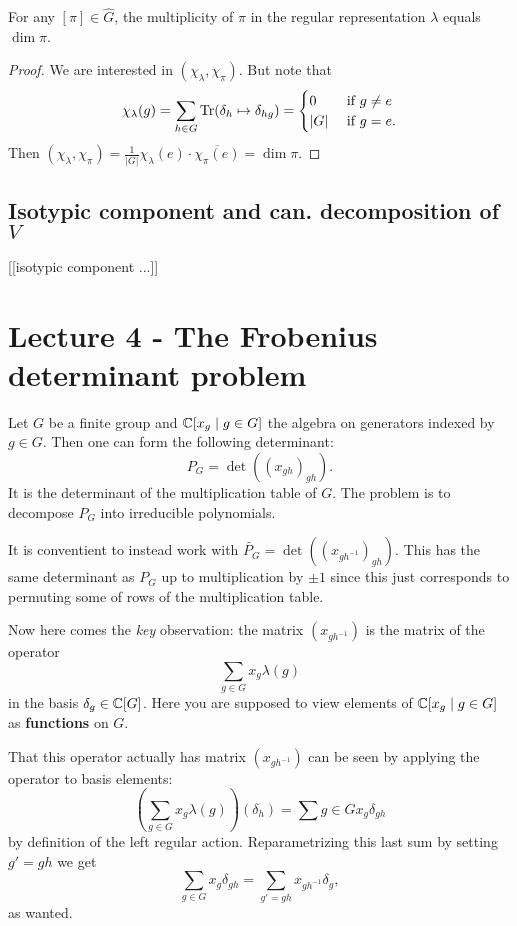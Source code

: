 \documentclass[11pt, english]{article}
\begin{document}
\begin{corr}
 For any $[\pi] \in \widehat G$, the multiplicity of $\pi$ in the regular representation $\lambda$ equals $\dim \pi$.
\end{corr}
\begin{proof}
 We are interested in $(\chi_\lambda, \chi_\pi)$. But note that
$$
\chi_\lambda(g) = \sum_{h \in G} \operatorname{Tr} ( \delta_h \mapsto \delta_{hg} ) = \begin{cases} 0 & \text{ if } g \neq e \\
\lvert G \rvert & \text{ if } g = e.
\end{cases}
$$
Then $(\chi_\lambda,\chi_\pi) = \frac{1}{\lvert G \rvert} \chi_\lambda(e) \cdot \overline{\chi_\pi(e)} = \dim \pi$.
\end{proof}

\subsection{Isotypic component and can. decomposition of $V$}

[[isotypic component ...]]


\section{Lecture 4 - The Frobenius determinant problem}

Let $G$ be a finite group and $\mathbb{C}[x_g \mid g \in G]$ the algebra on generators indexed by $g \in G$. Then one can form the following determinant:
$$
P_G  = \det \left( (x_{gh})_{gh} \right).
$$
It is the determinant of the multiplication table of $G$. The problem is to decompose $P_G$ into irreducible polynomials.

It is conventient to instead work with $\widetilde{P_G}=\det( {(x_{gh^{-1}})}_{gh})$. This has the same determinant as $P_G$ up to multiplication by $\pm 1$ since this just corresponds to permuting some of rows of the multiplication table.

Now here comes the \emph{key} observation: the matrix $(x_{gh^{-1}})$ is the matrix of the operator 
$$
\sum_{g \in G} x_g \lambda(g)
$$
in the basis $\delta_g \in \mathbb{C}[G]$. Here you are supposed to view elements of $\mathbb{C}[x_g \mid g \in G]$ as \textbf{functions} on $G$.

That this operator actually has matrix $(x_{gh^{-1}})$ can be seen by applying the operator to basis elements:
$$
\left(\sum_{g \in G} x_g \lambda(g)\right)(\delta_h) = \sum{g \in G} x_g \delta_{gh}
$$
by definition of the left regular action. Reparametrizing this last sum by setting $g' = gh$ we get
$$
\sum_{g \in G} x_g \delta_{gh} = \sum_{g' = gh} x_{gh^{-1}} \delta_g,
$$
as wanted.
\end{document}
